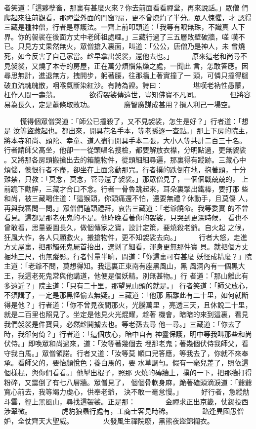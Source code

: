 \begin{pinyinscope}
{者笑道：「這夥孽畜，那裏有甚麼火來？你去前面看看禪堂，再來說話。」眾僧
們爬起來往前觀看，那禪堂外面的門窗?扇，更不曾燎灼了半分。眾人悚懼，才
認得三藏是種神僧，行者是尊護法。一齊上前叩頭道：「我等有眼無珠，不識真
人下界。你的袈裟在後面方丈中老師祖處哩。」三藏行過了三五層敗壁破牆，嗟
嘆不已。只見方丈果然無火，眾僧搶入裏面，叫道：「公公，唐僧乃是神人，未
曾燒死，如今反害了自己家當。趁早拿出袈裟，還他去也。」
　　
原來這老和尚尋不見袈裟，又燒了本寺的房屋，正在萬分煩惱焦燥之處，一聞此
言，怎敢答應。因尋思無計，進退無方，拽開步，躬著腰，往那牆上著實撞了一
頭，可憐只撞得腦破血流魂魄散，咽喉氣斷染紅沙。有詩為證。詩曰：
　　　　堪嘆老衲性愚蒙，枉作人間一壽翁。
　　　　欲得袈裟傳遠世，豈知佛寶不凡同。
　　　　但將容易為長久，定是蕭條取敗功。
　　　　廣智廣謀成甚用？損人利己一場空。

　　
慌得個眾僧哭道：「師公已撞殺了，又不見袈裟，怎生是好？」行者道：「想是
汝等盜藏起也。都出來，開具花名手本，等老孫逐一查點。」那上下房的院主，
將本寺和尚、頭陀、幸童、道人盡行開具手本二張，大小人等共計二百三十名。
行者請師父高坐，他卻一一從頭唱名搜檢，都要解放衣襟，分明點過，更無袈裟
。又將那各房頭搬搶出去的箱籠物件，從頭細細尋遍，那裏得有蹤跡。三藏心中
煩惱，懊恨行者不盡，卻坐在上面念動那咒。行者撲的跌倒在地，抱著頭，十分
難禁，只教：「莫念，莫念，管尋還了袈裟。」那眾僧見了，一個個戰兢兢的，
上前跪下勸解，三藏才合口不念。行者一骨魯跳起來，耳朵裏掣出鐵棒，要打那
些和尚，被三藏喝住道：「這猴頭，你頭痛還不怕，還要無禮？休動手，且莫傷
人，再與我審問一問。」眾僧們磕頭禮拜，哀告三藏道：「老爺饒命。我等委實
的不曾看見。這都是那老死鬼的不是。他昨晚看著你的袈裟，只哭到更深時候，
看也不曾敢看，思量要圖長久，做個傳家之寶，設計定策，要燒殺老爺。自火起
之候，狂風大作，各人只顧救火，搬搶物件，更不知袈裟去向。」
　　
行者大怒，走進方丈屋裏，把那觸死鬼屍首抬出，選剝了細看，渾身更無那件寶
貝。就把個方丈掘地三尺，也無蹤影。行者忖量半晌，問道：「你這裏可有甚麼
妖怪成精麼？」院主道：「老爺不問，莫想得知。我這裏正東南有座黑風山，黑
風洞內有一個黑大王，我這老死鬼常與他講道，他便是個妖精。別無甚物。」行
者道：「那山離此有多遠近？」院主道：「只有二十里，那望見山頭的就是。」
行者笑道：「師父放心，不須講了，一定是那黑怪偷去無疑。」三藏道：「他那
廂離此有二十里，如何就斷得是他？」行者道：「你不曾見夜間那火，光騰萬里
，亮透三天，且休說二十里，就是二百里也照見了。坐定是他見火光焜耀，趁著
機會，暗暗的來到這裏，看見我們袈裟是件寶貝，必然趁鬨擄去也。等老孫去尋
他一尋。」三藏道：「你去了時，我卻何倚？」行者道：「這個放心，暗中自有
神靈保護，明中等我叫那些和尚伏侍。」即喚眾和尚過來，道：「汝等著幾個去
埋那老鬼；著幾個伏侍我師父，看守我白馬。」眾僧領諾。行者又道：「汝等莫
順口兒答應，等我去了，你就不來奉承。看師父的，要怡顏悅色；養白馬的，要
水草調勻。假有一毫兒差了，照依這個樣棍，與你們看看。」他掣出棍子，照那
火燒的磚牆上，撲的一下，把那牆打得粉碎，又震倒了有七八層牆。眾僧見了，
個個骨軟身麻，跪著磕頭滴淚道：「爺爺寬心前去，我等竭力虔心，供奉老爺，
決不敢一毫怠慢。」
　　
好行者，急縱觔斗雲，徑上黑風山，尋找這袈裟。正是那：
　　　　金禪求正出京畿，仗錫投西涉翠微。
　　　　虎豹狼蟲行處有，工商士客見時稀。
　　　　路逢異國愚僧妒，全仗齊天大聖威。
　　　　火發風生禪院廢，黑熊夜盜錦襴衣。

}
\end{pinyinscope}
